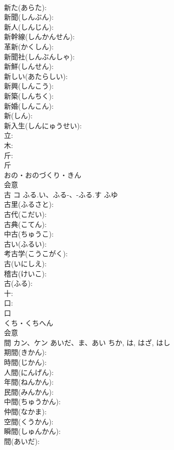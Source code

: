 \documentclass[8pt]{extreport}
\begin{document}
\begin{CJK}{UTF8}{min}
\\	新た(あらた): 
\\	新聞(しんぶん): 
\\	新人(しんじん): 
\\	新幹線(しんかんせん): 
\\	革新(かくしん): 
\\	新聞社(しんぶんしゃ): 
\\	新鮮(しんせん): 
\\	新しい(あたらしい): 
\\	新興(しんこう): 
\\	新築(しんちく): 
\\	新婚(しんこん): 
\\	新(しん): 
\\	新入生(しんにゅうせい): 
\\	立: 
\\	木: 
\\	斤: 
\\	斤	
\\	おの・おのづくり・きん	
\\	会意 
\\	古	コ	ふる.い、ふる-、-ふる.す	ふゆ	
\\	古里(ふるさと): 
\\	古代(こだい): 
\\	古典(こてん): 
\\	中古(ちゅうこ): 
\\	古い(ふるい): 
\\	考古学(こうこがく): 
\\	古(いにしえ): 
\\	稽古(けいこ): 
\\	古(ふる): 
\\	十: 
\\	口: 
\\	口	
\\	くち・くちへん	
\\	会意 
\\	間	カン、ケン	あいだ、ま、あい	ちか, は, はざ, はし	
\\	期間(きかん): 
\\	時間(じかん): 
\\	人間(にんげん): 
\\	年間(ねんかん): 
\\	民間(みんかん): 
\\	中間(ちゅうかん): 
\\	仲間(なかま): 
\\	空間(くうかん): 
\\	瞬間(しゅんかん): 
\\	間(あいだ): 

\end{CJK}
\end{document}
